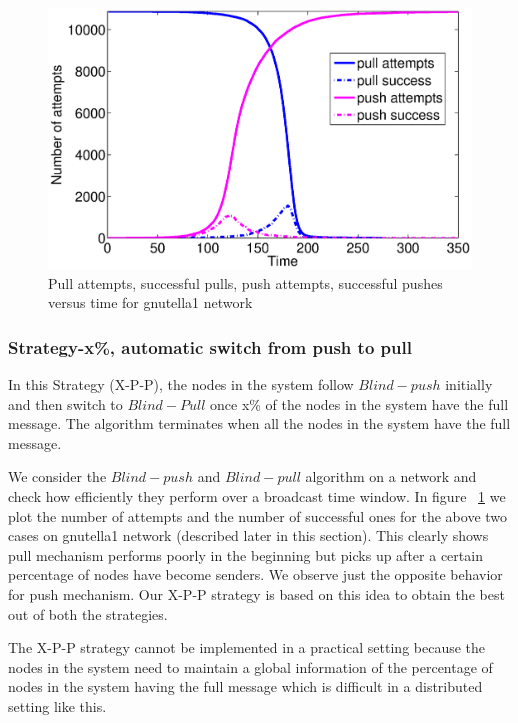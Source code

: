 \begin{figure}
\centering
\includegraphics[scale=0.25]{./texfiles/Chapter_3/netsci/figs1/ps_pl_at_su.eps}
\caption{Pull attempts, successful pulls, push attempts, successful pushes versus time for gnutella1 network}
\label{ps_pl_at_su}
\end{figure}

\subsubsection{Strategy-x\%, automatic switch from push to pull}

In this Strategy (X-P-P), the nodes in the system follow $Blind-push$ initially and then switch to $Blind-Pull$ once x\% of the nodes in the system have 
the full message. The algorithm terminates when all the nodes in the system have the full message.

We consider the $Blind-push$ and $Blind-pull$ algorithm on a network and check how efficiently they perform over a broadcast time window. 
In figure ~\ref{ps_pl_at_su} we plot the number of attempts and the number of successful ones for the above two cases on 
  gnutella1 network (described later in this section). 
  This clearly shows pull mechanism  
  performs poorly in the beginning but picks up after a certain percentage of nodes have become senders. We observe just the opposite behavior 
  for push mechanism. Our X-P-P strategy is based on this idea to obtain the best out of both the strategies.

The X-P-P strategy cannot be implemented in a practical setting  because the nodes in the system need to maintain a global information of the percentage of nodes in the 
system having the full message which is difficult in a distributed setting like this.



